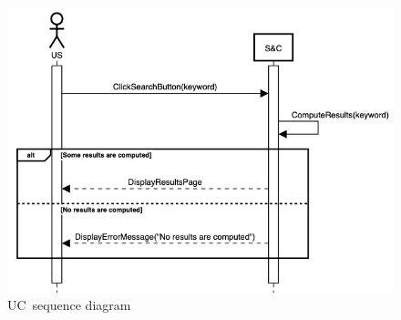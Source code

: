 \begin{figure}[h]
    \centering
    \includegraphics[width=13cm]{images/sequence-diagrams/student-searches-position.png}
    \caption{UC\theuc\ sequence diagram}
\end{figure}


